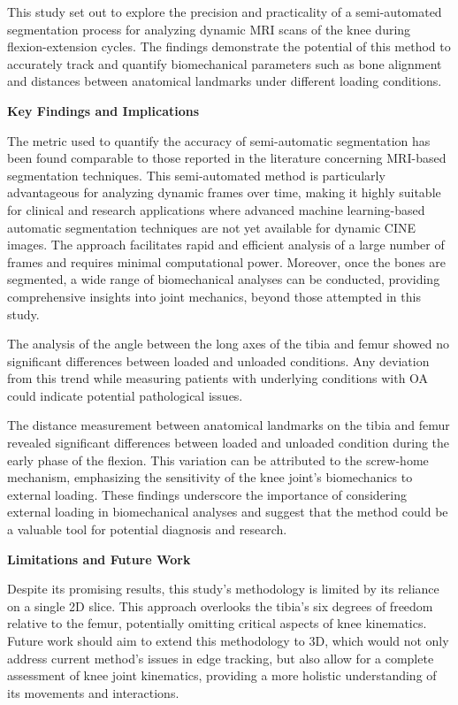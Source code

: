 \documentclass{micro-econ-thesis}
\begin{document}
This study set out to explore the precision and practicality of a semi-automated segmentation process for analyzing dynamic MRI scans of the knee during flexion-extension cycles. The findings demonstrate the potential of this method to accurately track and quantify biomechanical parameters such as bone alignment and distances between anatomical landmarks under different loading conditions.

\textbf{Key Findings and Implications}

The metric used to quantify the accuracy of semi-automatic segmentation has been found comparable to those reported in the literature concerning MRI-based segmentation techniques. This semi-automated method is particularly advantageous for analyzing dynamic frames over time, making it highly suitable for clinical and research applications where advanced machine learning-based automatic segmentation techniques are not yet available for dynamic CINE images. The approach facilitates rapid and efficient analysis of a large number of frames and requires minimal computational power. Moreover, once the bones are segmented, a wide range of biomechanical analyses can be conducted, providing comprehensive insights into joint mechanics, beyond those attempted in this study.

The analysis of the angle between the long axes of the tibia and femur showed no significant differences between loaded and unloaded conditions. Any deviation from this trend while measuring patients with underlying conditions with OA could indicate potential pathological issues.

The distance measurement between anatomical landmarks on the tibia and femur revealed significant differences between loaded and unloaded condition during the early phase of the flexion. This variation can be attributed to the screw-home mechanism, emphasizing the sensitivity of the knee joint's biomechanics to external loading. These findings underscore the importance of considering external loading in biomechanical analyses and suggest that the method could be a valuable tool for potential diagnosis and research.



\textbf{Limitations and Future Work}

Despite its promising results, this study's methodology is limited by its reliance on a single 2D slice. This approach overlooks the tibia's six degrees of freedom relative to the femur, potentially omitting critical aspects of knee kinematics. Future work should aim to extend this methodology to 3D, which would not only address current method's issues in edge tracking, but also allow for a complete assessment of knee joint kinematics, providing a more holistic understanding of its movements and interactions.
\end{document}
